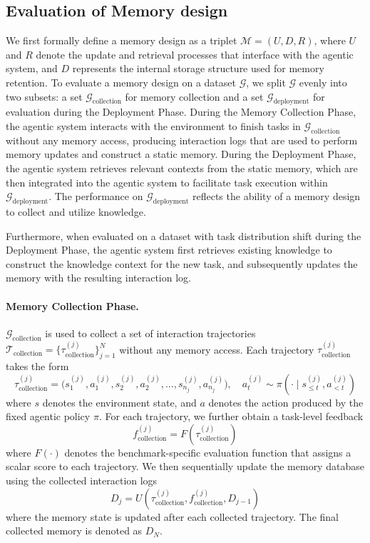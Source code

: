 \documentclass{article}
\theoremstyle{plain}
\theoremstyle{definition}
\theoremstyle{remark}
\begin{document}
\subsection{Evaluation of Memory design}
\label{eval_process}
We first formally define a memory design as a triplet $\mathcal{M} = (U, D, R)$, where $U$ and $R$ denote the update and retrieval processes that interface with the agentic system, and $D$ represents the internal storage structure used for memory retention.
To evaluate a memory design on a dataset $\mathcal{G}$, 
we split $\mathcal{G}$ evenly into two subsets: 
a set $\mathcal{G}_{\text{collection}}$ for memory collection  and a set $\mathcal{G}_{\text{deployment}}$ for evaluation during the Deployment Phase. 
During the Memory Collection Phase, the agentic system interacts with the environment to finish tasks in $\mathcal{G}_{\text{collection}}$ without any memory access, 
producing interaction logs that are used to perform memory updates and construct a static memory.
During the Deployment Phase, the agentic system retrieves relevant contexts from the static memory, which are then integrated into the agentic system to facilitate task execution within $\mathcal{G}_{\text{deployment}}$.
The performance on $\mathcal{G}_{\text{deployment}}$ reflects the ability of a memory design to collect and utilize knowledge.

Furthermore, when evaluated on a dataset with task distribution shift during the Deployment Phase, the agentic system first retrieves existing knowledge to construct the knowledge context for the new task, and subsequently updates the memory with the resulting interaction log.

\paragraph{Memory Collection Phase.}
$\mathcal{G}_{\text{collection}}$ is used to collect a set of interaction trajectories 
$\mathcal{T}_{\text{collection}} = \{ \tau^{(j)}_{\text{collection}} \}_{j=1}^{N}$ 
without any memory access. 
Each trajectory $\tau^{(j)}_{\text{collection}}$ takes the form
\[
\tau^{(j)}_{\text{collection}} 
= \big( s^{(j)}_1, a^{(j)}_1, s^{(j)}_2, a^{(j)}_2, \ldots, s^{(j)}_{n_j}, a^{(j)}_{n_j} \big),
\quad 
a^{(j)}_t \sim \pi(\cdot \mid s^{(j)}_{\le t}, a^{(j)}_{<t})
\]
where $s$ denotes the environment state, and $a$ denotes the action produced by the fixed agentic policy $\pi$.
For each trajectory, we further obtain a task-level feedback
\[
f^{(j)}_{\text{collection}} = F\!\left(\tau^{(j)}_{\text{collection}}\right)
\]
where $F(\cdot)$ denotes the benchmark-specific evaluation function that assigns a scalar score to each trajectory. We then sequentially update the memory database using the collected interaction logs
\[
D_j = U\!\left(\tau^{(j)}_{\text{collection}}, f^{(j)}_{\text{collection}}, D_{j-1}\right)
\]
where the memory state is updated after each collected trajectory. The final collected memory is denoted as $D_N$.
\end{document}
